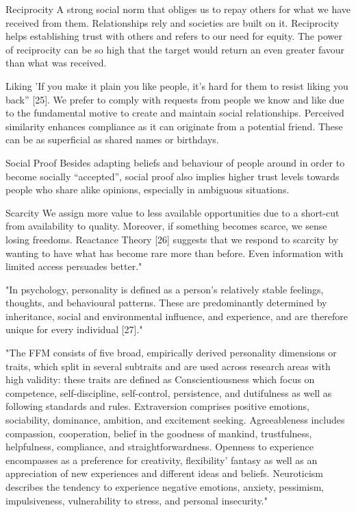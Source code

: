 Reciprocity
A strong social norm that obliges us to repay others for what we have received from them. Relationships rely and societies are built on it. Reciprocity helps establishing trust with others and refers to our need for equity. The power of reciprocity can be so high that the target would return an even greater favour than what was received.

Liking
'If you make it plain you like people, it's hard for them to resist liking you back” [25]. We prefer to comply with requests from people we know and like due to the fundamental motive to create and maintain social relationships. Perceived similarity enhances compliance as it can originate from a potential friend. These can be as superficial as shared names or birthdays.

Social Proof
Besides adapting beliefs and behaviour of people around in order to become socially “accepted”, social proof also implies higher trust levels towards people who share alike opinions, especially in ambiguous situations.

Scarcity
We assign more value to less available opportunities due to a short-cut from availability to quality. Moreover, if something becomes scarce, we sense losing freedoms. Reactance Theory [26] suggests that we respond to scarcity by wanting to have what has become rare more than before. Even information with limited access persuades better."\cite{7_mdpi}

"In psychology, personality is defined as a person's relatively stable feelings, thoughts, and behavioural patterns. These are predominantly determined by inheritance, social and environmental influence, and experience, and are therefore unique for every individual [27]."\cite{7_mdpi}


"The FFM consists of five broad, empirically derived personality dimensions or traits, which split in several subtraits and are used across research areas with high validity: these traits are defined as Conscientiousness which focus on competence, self-discipline, self-control, persistence, and dutifulness as well as following standards and rules. Extraversion comprises positive emotions, sociability, dominance, ambition, and excitement seeking. Agreeableness includes compassion, cooperation, belief in the goodness of mankind, trustfulness, helpfulness, compliance, and straightforwardness. Openness to experience encompasses as a preference for creativity, flexibility’ fantasy as well as an appreciation of new experiences and different ideas and beliefs. Neuroticism describes the tendency to experience negative emotions, anxiety, pessimism, impulsiveness, vulnerability to stress, and personal insecurity."\cite{7_mdpi}

